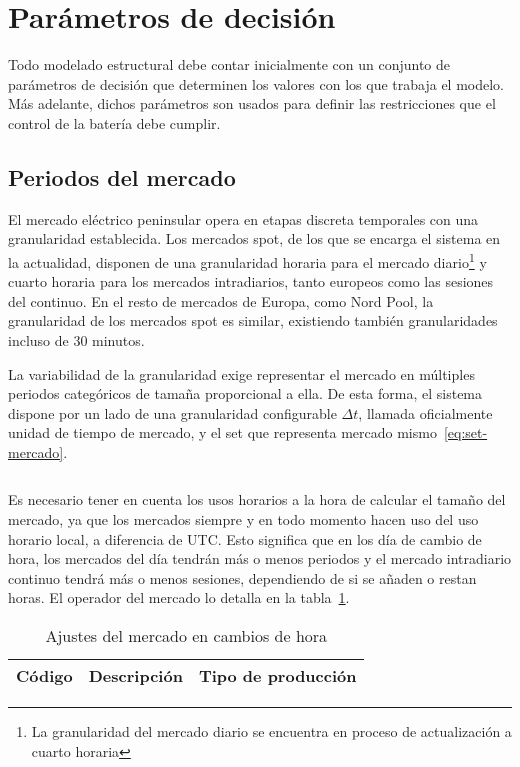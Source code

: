 \section{Parámetros de decisión}
\label{makereference5.1}

Todo modelado estructural debe contar inicialmente con un conjunto de parámetros de decisión que determinen los valores con los que trabaja el modelo. Más adelante, dichos parámetros son usados para definir las restricciones que el control de la batería debe cumplir.

\subsection{Periodos del mercado}
\label{makereference5.1.1}

El mercado eléctrico peninsular opera en etapas discreta temporales con una granularidad establecida. Los mercados spot, de los que se encarga el sistema en la actualidad, disponen de una granularidad horaria para el mercado diario\footnote{La granularidad del mercado diario se encuentra en proceso de actualización a cuarto horaria} y cuarto horaria para los mercados intradiarios, tanto europeos como las sesiones del continuo. En el resto de mercados de Europa, como Nord Pool, la granularidad de los mercados spot es similar, existiendo también granularidades incluso de 30 minutos.

La variabilidad de la granularidad exige representar el mercado en múltiples periodos categóricos de tamaña proporcional a ella. De esta forma, el sistema dispone por un lado de una granularidad configurable \( \Delta t \), llamada oficialmente unidad de tiempo de mercado, y el set que representa mercado mismo~\ref{eq:set-mercado}.

\begin{equation}
  \label{eq:set-mercado}
\end{equation}

Es necesario tener en cuenta los usos horarios a la hora de calcular el tamaño del mercado, ya que los mercados siempre y en todo momento hacen uso del uso horario local, a diferencia de UTC. Esto significa que en los día de cambio de hora, los mercados del día tendrán más o menos periodos y el mercado intradiario continuo tendrá más o menos sesiones, dependiendo de si se añaden o restan horas. El operador del mercado lo detalla en la tabla~\ref{tab:cambio-hora}.

\begin{table}[ht]
  \centering
  \begin{tabular}[c]{|l|l|l|}
    \hline
    Código & Descripción & Tipo de producción \\
    \hline
    \hline
  \end{tabular}
  \caption{Ajustes del mercado en cambios de hora}
  \label{tab:cambio-hora}
\end{table}

